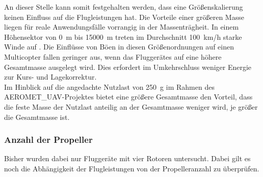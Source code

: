 An dieser Stelle kann somit festgehalten werden, dass eine Größenskalierung keinen Einfluss auf die Flugleistungen hat. Die Vorteile einer größeren Masse liegen für reale Anwendungsfälle vorrangig in der Massenträgheit. In einem Höhensektor von \SI{0}{m} bis \SI{15000}{m} treten im Durchschnitt \SI{100}{km/h} starke Winde auf \cite{Seidel.2011}. Die Einflüsse von Böen in diesen Größenordnungen auf einen Multicopter fallen geringer aus, wenn das Fluggerätes auf eine höhere Gesamtmasse ausgelegt wird. Dies erfordert im Umkehrschluss weniger Energie zur Kurs- und Lagekorrektur. \\
Im Hinblick auf die angedachte Nutzlast von \SI{250}{g} im Rahmen des AEROMET\_UAV-Projektes bietet eine größere Gesamtmasse den Vorteil, dass die feste Masse der Nutzlast anteilig an der Gesamtmasse weniger wird, je größer die Gesamtmasse ist.


\subsubsection{Anzahl der Propeller}
\label{subsubsec:anz_prop}
Bisher wurden dabei nur Fluggeräte mit vier Rotoren untersucht. Dabei gilt es noch die Abhängigkeit der Flugleistungen von der Propelleranzahl zu überprüfen. 

